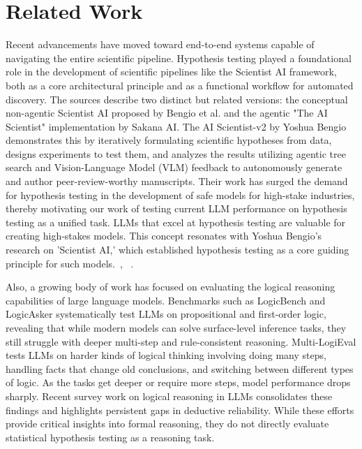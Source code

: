 \documentclass{article}
\begin{document}
\section{Related Work}
Recent advancements have moved toward end-to-end systems capable of navigating the entire scientific pipeline. Hypothesis testing played a foundational role in the development of scientific pipelines like the Scientist AI framework, both as a core architectural principle and as a functional workflow for automated discovery. The sources describe two distinct but related versions: the conceptual non-agentic Scientist AI proposed by Bengio et al. and the agentic "The AI Scientist" implementation by Sakana AI. The AI Scientist-v2 by Yoshua Bengio \cite{yamada2025ai} demonstrates this by iteratively formulating scientific hypotheses from data, designs experiments to test them, and analyzes the results utilizing agentic tree search and Vision-Language Model (VLM) feedback to autonomously generate and author peer-review-worthy manuscripts. Their work has surged the demand for hypothesis testing in the development of safe models for high-stake industries, thereby motivating our work of testing current LLM performance on hypothesis testing as a unified task. LLMs that excel at hypothesis testing are valuable for creating high-stakes models. This concept resonates with Yoshua Bengio's research on 'Scientist AI,' which established hypothesis testing as a core guiding principle for such models.~\cite{bengio2025superintelligent}, ~\cite{yamada2025ai}.

Also, a growing body of work has focused on evaluating the logical reasoning capabilities of large language models. Benchmarks such as LogicBench \cite{parmar2024logicbench} and LogicAsker \cite{wan2024logicasker} systematically test LLMs on propositional and first-order logic, revealing that while modern models can solve surface-level inference tasks, they still struggle with deeper multi-step and rule-consistent reasoning. Multi-LogiEval \cite{patel2024multi} tests LLMs on harder kinds of logical thinking involving doing many steps, handling facts that change old conclusions, and switching between different types of logic. As the tasks get deeper or require more steps, model performance drops sharply. Recent survey work on logical reasoning in LLMs \cite{liu2025logical} consolidates these findings and highlights persistent gaps in deductive reliability. While these efforts provide critical insights into formal reasoning, they do not directly evaluate statistical hypothesis testing as a reasoning task.
\end{document}
